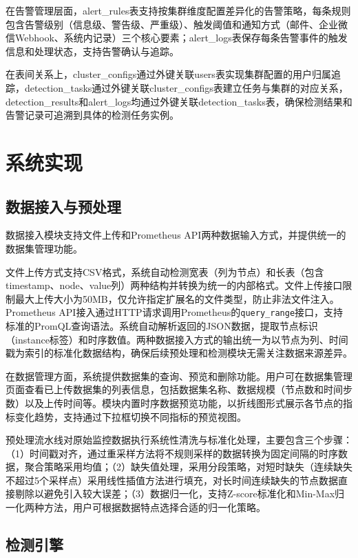 在告警管理层面，alert\_rules表支持按集群维度配置差异化的告警策略，每条规则包含告警级别（信息级、警告级、严重级）、触发阈值和通知方式（邮件、企业微信Webhook、系统内记录）三个核心要素；alert\_logs表保存每条告警事件的触发信息和处理状态，支持告警确认与追踪。

在表间关系上，cluster\_configs通过外键关联users表实现集群配置的用户归属追踪，detection\_tasks通过外键关联cluster\_configs表建立任务与集群的对应关系，detection\_results和alert\_logs均通过外键关联detection\_tasks表，确保检测结果和告警记录可追溯到具体的检测任务实例。

\section{系统实现}

\subsection{数据接入与预处理}

数据接入模块支持文件上传和Prometheus API两种数据输入方式，并提供统一的数据集管理功能。

文件上传方式支持CSV格式，系统自动检测宽表（列为节点）和长表（包含timestamp、node、value列）两种结构并转换为统一的内部格式。文件上传接口限制最大上传大小为50MB，仅允许指定扩展名的文件类型，防止非法文件注入。Prometheus API接入通过HTTP请求调用Prometheus的\texttt{query\_range}接口，支持标准的PromQL查询语法。系统自动解析返回的JSON数据，提取节点标识（instance标签）和时序数值。两种数据接入方式的输出统一为以节点为列、时间戳为索引的标准化数据结构，确保后续预处理和检测模块无需关注数据来源差异。

在数据管理方面，系统提供数据集的查询、预览和删除功能。用户可在数据集管理页面查看已上传数据集的列表信息，包括数据集名称、数据规模（节点数和时间步数）以及上传时间等。模块内置时序数据预览功能，以折线图形式展示各节点的指标变化趋势，支持通过下拉框切换不同指标的预览视图。

预处理流水线对原始监控数据执行系统性清洗与标准化处理，主要包含三个步骤：（1）时间戳对齐，通过重采样方法将不规则采样的数据转换为固定间隔的时序数据，聚合策略采用均值；（2）缺失值处理，采用分段策略，对短时缺失（连续缺失不超过5个采样点）采用线性插值方法进行填充，对长时间连续缺失的节点数据直接剔除以避免引入较大误差；（3）数据归一化，支持Z-score标准化和Min-Max归一化两种方法，用户可根据数据特点选择合适的归一化策略。

\subsection{检测引擎}


